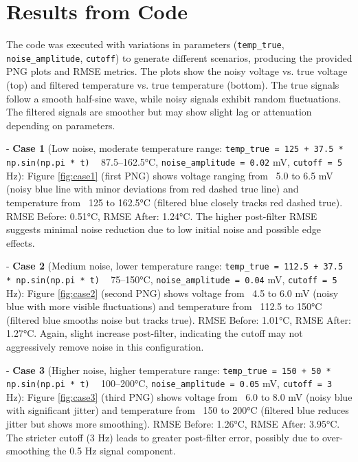 \documentclass[12pt]{article}
\begin{document}
\section*{Results from Code}
The code was executed with variations in parameters (\texttt{temp\_true}, \texttt{noise\_amplitude}, \texttt{cutoff}) to generate different scenarios, producing the provided PNG plots and RMSE metrics. The plots show the noisy voltage vs. true voltage (top) and filtered temperature vs. true temperature (bottom). The true signals follow a smooth half-sine wave, while noisy signals exhibit random fluctuations. The filtered signals are smoother but may show slight lag or attenuation depending on parameters.

- \textbf{Case 1} (Low noise, moderate temperature range: \texttt{temp\_true = 125 + 37.5 * np.sin(np.pi * t)} ~ 87.5–162.5°C, \texttt{noise\_amplitude = 0.02} mV, \texttt{cutoff = 5} Hz):  
  Figure \ref{fig:case1} (first PNG) shows voltage ranging from ~5.0 to 6.5 mV (noisy blue line with minor deviations from red dashed true line) and temperature from ~125 to 162.5°C (filtered blue closely tracks red dashed true). RMSE Before: 0.51°C, RMSE After: 1.24°C. The higher post-filter RMSE suggests minimal noise reduction due to low initial noise and possible edge effects.

- \textbf{Case 2} (Medium noise, lower temperature range: \texttt{temp\_true = 112.5 + 37.5 * np.sin(np.pi * t)} ~ 75–150°C, \texttt{noise\_amplitude = 0.04} mV, \texttt{cutoff = 5} Hz):  
  Figure \ref{fig:case2} (second PNG) shows voltage from ~4.5 to 6.0 mV (noisy blue with more visible fluctuations) and temperature from ~112.5 to 150°C (filtered blue smooths noise but tracks true). RMSE Before: 1.01°C, RMSE After: 1.27°C. Again, slight increase post-filter, indicating the cutoff may not aggressively remove noise in this configuration.

- \textbf{Case 3} (Higher noise, higher temperature range: \texttt{temp\_true = 150 + 50 * np.sin(np.pi * t)} ~ 100–200°C, \texttt{noise\_amplitude = 0.05} mV, \texttt{cutoff = 3} Hz):  
  Figure \ref{fig:case3} (third PNG) shows voltage from ~6.0 to 8.0 mV (noisy blue with significant jitter) and temperature from ~150 to 200°C (filtered blue reduces jitter but shows more smoothing). RMSE Before: 1.26°C, RMSE After: 3.95°C. The stricter cutoff (3 Hz) leads to greater post-filter error, possibly due to over-smoothing the 0.5 Hz signal component.
\end{document}
